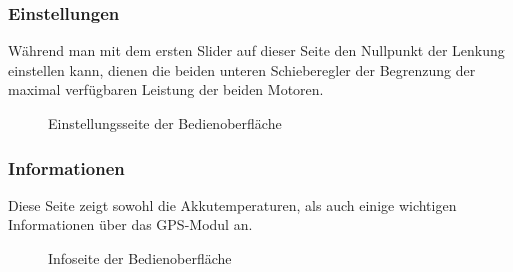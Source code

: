 \subsubsection{Einstellungen}
Während man mit dem ersten Slider auf dieser Seite den Nullpunkt der Lenkung einstellen kann, 
dienen die beiden unteren Schieberegler der Begrenzung der maximal verfügbaren Leistung der beiden Motoren.
\begin{figure}[h]
    \caption{Einstellungsseite der Bedienoberfläche}
\end{figure}
\newpage

\subsubsection{Informationen}
Diese Seite zeigt sowohl die Akkutemperaturen, als auch einige wichtigen Informationen über das GPS-Modul an.
\begin{figure}[h]
    \caption{Infoseite der Bedienoberfläche}
\end{figure}
\newpage